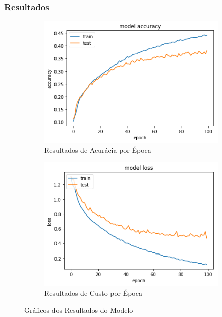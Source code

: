 \subsubsection{Resultados}

\begin{figure}[H]
  \centering
  \begin{subfigure}[b]{0.45\linewidth}
    \includegraphics[width=\linewidth]{img/enc-dec-3.png}
    \caption{Resultados de Acurácia por Época}
  \end{subfigure}
  \begin{subfigure}[b]{0.45\linewidth}
    \includegraphics[width=\linewidth]{img/enc-dec-3-loss.png}
    \caption{Resultados de Custo por Época}
  \end{subfigure}
  \caption{Gráficos dos Resultados do Modelo}
  \label{fig:plots3}
\end{figure}

